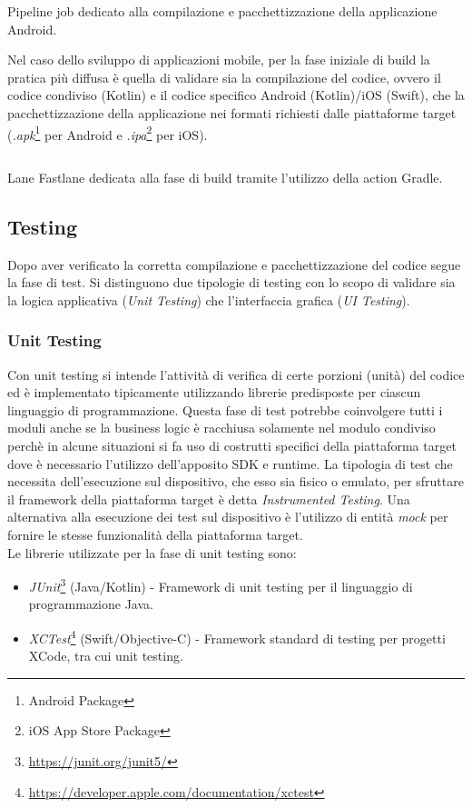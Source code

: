 \begin{listing}[H]
\inputminted{yaml}{code/4-buildjob}
\caption{Pipeline job dedicato alla compilazione e pacchettizzazione della applicazione Android.}
\end{listing}

Nel caso dello sviluppo di applicazioni mobile, per la fase iniziale di build la pratica più diffusa è quella di validare sia la compilazione del codice, ovvero il codice condiviso (Kotlin) e il codice specifico Android (Kotlin)/iOS (Swift), che la pacchettizzazione della applicazione nei formati richiesti dalle piattaforme target (\textit{.apk}\footnote{Android Package} per Android e \textit{.ipa}\footnote{iOS App Store Package} per iOS).

\begin{listing}[H]
\inputminted{ruby}{code/4-buildft}
\caption{Lane Fastlane dedicata alla fase di build tramite l'utilizzo della action Gradle.}
\end{listing}

\subsection{Testing}
Dopo aver verificato la corretta compilazione e pacchettizzazione del codice segue la fase di test. Si distinguono due tipologie di testing con lo scopo di validare sia la logica applicativa (\textit{Unit Testing}) che l'interfaccia grafica (\textit{UI Testing}).

\subsubsection{Unit Testing}
Con unit testing si intende l'attività di verifica di certe porzioni (unità) del codice ed è implementato tipicamente utilizzando librerie predisposte per ciascun linguaggio di programmazione. Questa fase di test potrebbe coinvolgere tutti i moduli anche se la business logic è racchiusa solamente nel modulo condiviso perchè in alcune situazioni si fa uso di costrutti specifici della piattaforma target dove è necessario l'utilizzo dell'apposito SDK e runtime. La tipologia di test che necessita dell'esecuzione sul dispositivo, che esso sia fisico o emulato, per sfruttare il framework della piattaforma target è detta \textit{Instrumented Testing}. Una alternativa alla esecuzione dei test sul dispositivo è l'utilizzo di entità \textit{mock} per fornire le stesse funzionalità della piattaforma target.\\
Le librerie utilizzate per la fase di unit testing sono:
\begin{itemize}
    \item \textit{JUnit}\footnote{\url{https://junit.org/junit5/}} (Java/Kotlin) - Framework di unit testing per il linguaggio di programmazione Java.
    \item \textit{XCTest}\footnote{\url{https://developer.apple.com/documentation/xctest}} (Swift/Objective-C) - Framework standard di testing per progetti XCode, tra cui unit testing.
\end{itemize}

